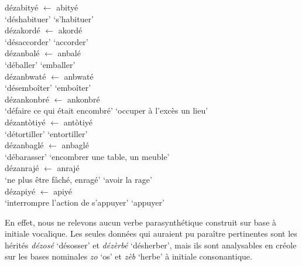\documentclass[output=paper]{langsci/langscibook}
\begin{document}
  \ea \label{ex:VilloingDeglas:41}
        \ea\label{ex:VilloingDeglas:41a}
          \ea \gll dézabityé $\leftarrow$ abityé\\
            {`déshabituer'} {} {`s'habituer'}\\
          \ex \gll  dézakordé $\leftarrow$ akordé\\
            {`désaccorder'} {} {`accorder'}\\
          \ex \gll  dézanbalé $\leftarrow$ anbalé\\
            {`déballer'} {} {`emballer'}\\
          \ex \gll  dézanbwaté $\leftarrow$ anbwaté\\
            {`désemboîter'} {} {`emboîter'}\\
            \ex \gll  dézankonbré $\leftarrow$ ankonbré \\
              {`défaire ce qui était encombré'} {} {`occuper à l'excès un lieu'}\\
          \z
        \ex\label{ex:VilloingDeglas:41b}
            \ea \gll dézantòtiyé $\leftarrow$ antòtiyé\\
              {`détortiller'} {} {`entortiller'}\\
            \ex \gll  dézanbaglé $\leftarrow$ anbaglé\\
              {`débarasser'} {} {`encombrer une table, un meuble'}\\
            \ex \gll  dézanrajé $\leftarrow$ anrajé\\
              {`ne plus être fâché, enragé'} {} {`avoir la rage'}\\
            \ex \gll  dézapiyé $\leftarrow$ apiyé\\
              {`interrompre l'action de s'appuyer'} {} {`appuyer'}\\
            \z
  \z\z


En effet, nous ne relevons aucun verbe parasynthétique construit sur
base à initiale vocalique. Les seules données qui auraient pu paraître
pertinentes sont les hérités \emph{dézosé} `désosser' et \emph{dézèrbé}
`désherber', mais ils sont analysables en créole sur les bases nominales
\emph{zo} `os' et \emph{zèb} `herbe' à initiale consonantique.

\label{propriétés-sémantiques-sens-privatif}
\end{document}
